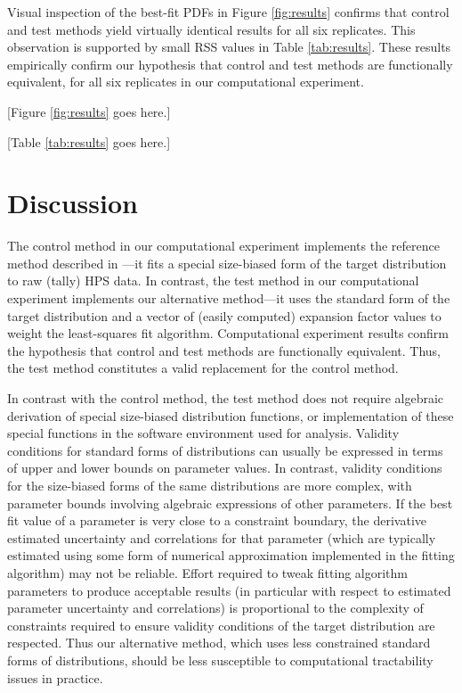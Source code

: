 \documentclass{foresj}
\begin{document}
  Visual inspection of the best-fit PDFs in Figure \ref{fig:results}
  confirms that control and test methods yield virtually identical
  results for all six replicates.
  This observation is supported by small RSS values in Table
  \ref{tab:results}.
  These results empirically confirm our hypothesis that control and
  test methods are functionally equivalent, for all six replicates in
  our computational experiment.

  [Figure \ref{fig:results} goes here.]
  
  [Table \ref{tab:results} goes here.]


\section{Discussion}
\label{sec:discussion}

The control method in our computational experiment implements the reference method described in
\citet{ducey2015sizebiased}---it fits a special size-biased form of the target distribution to raw (tally) HPS data. 
In contrast, the test method in our computational experiment
implements our alternative method---it uses the standard form of the target
distribution and a vector of (easily computed) expansion factor values
to weight the least-squares fit algorithm.
Computational experiment results confirm the hypothesis that control and
test methods are functionally equivalent. 
Thus, the test method constitutes a valid replacement for the control
method.

In contrast with the control method, the test method does not
require algebraic derivation of special size-biased distribution
functions, or implementation of these special functions in the software environment used
for analysis.
Validity conditions for standard forms of distributions can usually be expressed in terms of upper and lower bounds on parameter values. 
In contrast, validity conditions for the size-biased forms of the same distributions are more complex, with parameter bounds  involving algebraic expressions of other parameters. 
If the best fit value of a parameter is very close to a constraint boundary, the derivative estimated uncertainty and correlations for that parameter (which are typically estimated using some form of numerical approximation implemented in the fitting algorithm) may not be reliable.
Effort required to tweak fitting algorithm parameters to produce acceptable results (in particular with respect to estimated parameter uncertainty and correlations) is proportional to the complexity of constraints required to ensure validity conditions of the target distribution are respected.
Thus our alternative method, which uses less constrained standard
forms of distributions, should be less susceptible to computational
tractability issues in practice.
\end{document}
